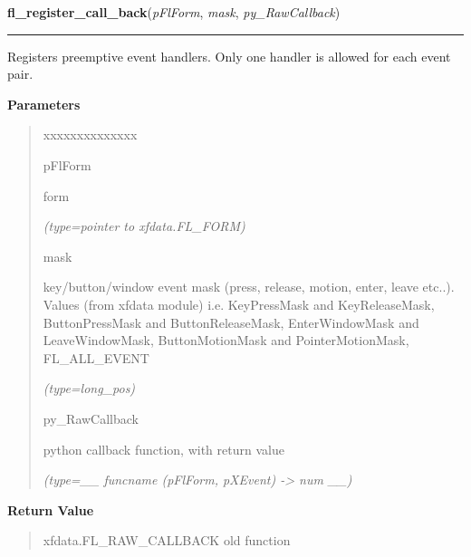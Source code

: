 \hspace{.8\funcindent}\begin{boxedminipage}{\funcwidth}

    \raggedright \textbf{fl\_register\_call\_back}(\textit{pFlForm}, \textit{mask}, \textit{py\_RawCallback})

    \vspace{-1.5ex}

    \rule{\textwidth}{0.5\fboxrule}
\setlength{\parskip}{2ex}
    Registers preemptive event handlers. Only one handler is allowed for 
    each event pair.

\setlength{\parskip}{1ex}
      \textbf{Parameters}
      \vspace{-1ex}

      \begin{quote}
        \begin{Ventry}{xxxxxxxxxxxxxx}

          \item[pFlForm]

          form

            {\it (type=pointer to xfdata.FL\_FORM)}

          \item[mask]

          key/button/window event mask (press, release, motion, enter, 
          leave etc..). Values (from xfdata module) i.e. KeyPressMask and 
          KeyReleaseMask, ButtonPressMask and ButtonReleaseMask, 
          EnterWindowMask and LeaveWindowMask, ButtonMotionMask and 
          PointerMotionMask, FL\_ALL\_EVENT

            {\it (type=long\_pos)}

          \item[py\_RawCallback]

          python callback function, with return value

            {\it (type=\_\_ funcname (pFlForm, pXEvent) -{\textgreater} num \_\_)}

        \end{Ventry}

      \end{quote}

      \textbf{Return Value}
    \vspace{-1ex}

      \begin{quote}
      xfdata.FL\_RAW\_CALLBACK old function

      \end{quote}


\end{boxedminipage}
